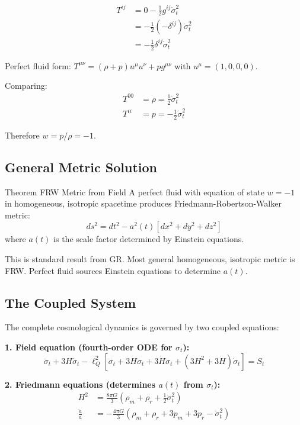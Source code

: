 \documentclass[11pt,a4paper]{article}
\theoremstyle{definition}
\theoremstyle{remark}
\begin{document}
		\begin{align}
			T^{ij} &= 0 - \frac{1}{2}g^{ij}\dot{\sigma}_t^2\\
			&= -\frac{1}{2}(-\delta^{ij})\dot{\sigma}_t^2\\
			&= -\frac{1}{2}\delta^{ij}\dot{\sigma}_t^2
		\end{align}
		
		Perfect fluid form: $T^{\mu\nu} = (\rho + p)u^\mu u^\nu + pg^{\mu\nu}$ with $u^\mu = (1, 0, 0, 0)$.
		
		Comparing:
		\begin{align}
			T^{00} &= \rho = \frac{1}{2}\dot{\sigma}_t^2\\
			T^{ii} &= p = -\frac{1}{2}\dot{\sigma}_t^2
		\end{align}
		
		Therefore $w = p/\rho = -1$.

	
	\subsection{General Metric Solution}
	
	Theorem FRW Metric from Field
		A perfect fluid with equation of state $w = -1$ in homogeneous, isotropic spacetime produces Friedmann-Robertson-Walker metric:
		\begin{equation}\label{eq:frw_metric}
			\boxed{ds^2 = dt^2 - a^2(t)[dx^2 + dy^2 + dz^2]}
		\end{equation}
		where $a(t)$ is the scale factor determined by Einstein equations.
	
		This is standard result from GR. Most general homogeneous, isotropic metric is FRW. Perfect fluid sources Einstein equations to determine $a(t)$.
	
	\subsection{The Coupled System}
	
	The complete cosmological dynamics is governed by two coupled equations:
	
	\textbf{1. Field equation (fourth-order ODE for $\sigma_t$):}
	\begin{equation}\label{eq:field_evolution}
		\ddot{\sigma}_t + 3H\dot{\sigma}_t - \ell_Q^2\left[\ddddot{\sigma}_t + 3H\dddot{\sigma}_t + 3\dot{H}\ddot{\sigma}_t + (3H^2 + 3\dot{H})\dot{\sigma}_t\right] = S_t
	\end{equation}
	
	\textbf{2. Friedmann equations (determines $a(t)$ from $\sigma_t$):}
	\begin{align}
		H^2 &= \frac{8\pi G}{3}\left(\rho_m + \rho_r + \frac{1}{2}\dot{\sigma}_t^2\right)\label{eq:friedmann1}\\
		\frac{\ddot{a}}{a} &= -\frac{4\pi G}{3}\left(\rho_m + \rho_r + 3p_m + 3p_r - \dot{\sigma}_t^2\right)\label{eq:friedmann2}
	\end{align}
	
\end{document}
